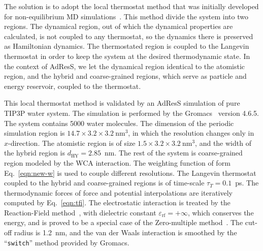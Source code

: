 \documentclass[epjST]{svjour}
\newcommand{\HY}[0]{\textrm{HY}}
\begin{document}
The solution is to adopt the local thermostat method that was initially
developed for non-equilibrium MD simulations~\cite{wang2014exploring}.
This method divide the system into two regions.
The dynamical region, out of which the dynamical properties are calculated, is not coupled
to any thermostat, so the dynamics there is preserved as Hamiltonian dynamics.
The thermostated region is coupled to the Langevin thermostat in order to keep the system
at the desired thermodynamic state.
In the context of AdResS, we let the dynamical region identical to the atomistic region,
and
the hybrid and coarse-grained regions, which serve as particle and energy reservoir, coupled to the thermostat.

This local thermostat method is validated by an AdResS simulation of pure TIP3P
water system.
The simulation is performed by the Gromacs~\cite{pronk2013gromacs} version 4.6.5.
The system contains 5000 water molecules.  The dimension of the periodic
simulation region is $14.7\times3.2\times3.2~\textrm{nm}^3$,
in which the resolution changes only in $x$-direction.
The atomistic region is of size $1.5\times3.2\times3.2~\textrm{nm}^3$, and the width of the hybrid region is $d_{\HY} = 2.85$~nm.
The rest of the system is coarse-grained region modeled by the WCA interaction.
The weighting function of form Eq.~\eqref{eqn:new-w} is used to couple different resolutions.
The Langevin thermostat coupled to the hybrid and coarse-grained regions is of time-scale $\tau_T = 0.1$~ps.
The thermodynamic forces of force and potential interpolations are iteratively computed by
Eq.~\eqref{eqn:tfi}.
The electrostatic interaction is treated by the Reaction-Field method~\cite{onsager1936electric,tironi1995generalized},
with dielectric constant $\varepsilon_{\textrm{rf}} = +\infty$, which conserves the energy, and
is proved to be a special case of the  Zero-multiple method~\cite{fukuda2011molecular,fukuda2013zero}.
The cut-off radius is 1.2~nm, and the van der Waals interaction is smoothed by the ``\texttt{switch}'' method provided by
Gromacs.
\end{document}

